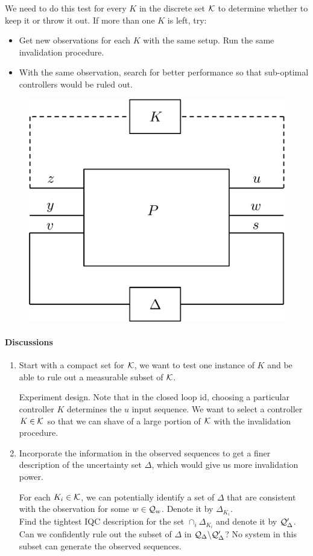 \documentclass[11pt, onecolumn]{article}
\begin{document}
We need to do this test for every $K$ in the discrete set $\mathcal K$ to determine whether to keep it or
throw it out. If more than one $K$ is left, try:
\begin{itemize}
\item Get new observations for each $K$ with the same setup. Run the same invalidation procedure.
\item With the same observation, search for better performance so that sub-optimal controllers would
  be ruled out.
\end{itemize}



\begin{figure}[!ht]
  \centering
  \includegraphics[width=.4\linewidth]{sys1.pdf}
\end{figure}




\paragraph{Discussions}
\begin{enumerate}
\item Start with a compact set for $\mathcal K$, we want to test one instance of $K$ and be able to rule
  out a measurable subset of $\mathcal K$.

  Experiment design. Note that in the closed loop id, choosing a particular controller $K$
  determines the $u$ input sequence. We want to select a controller $K\in \mathcal K$ so that we can
  shave of a large portion of $\mathcal K$ with the invalidation procedure.

\item Incorporate the information in the observed sequences to get a finer description of the
  uncertainty set $\Delta$, which would give us more invalidation power.

 For each $K_i\in\mathcal K$, we can potentially identify a set of $\Delta$ that are consistent with
  the observation for some $w\in\mathcal Q_{w}$. Denote it by $\Delta_{K_i}$.
  \\
  Find the tightest IQC description for the set $\cap_i \Delta_{K_i}$ and denote it by $\mathcal
  Q_{\Delta}'$.  Can we confidently rule out the subset of $\Delta$ in $\mathcal Q_{\Delta} \backslash
  \mathcal Q_{\Delta}'$?  No system in this subset can generate the observed sequences.


\end{enumerate}








\end{document}
